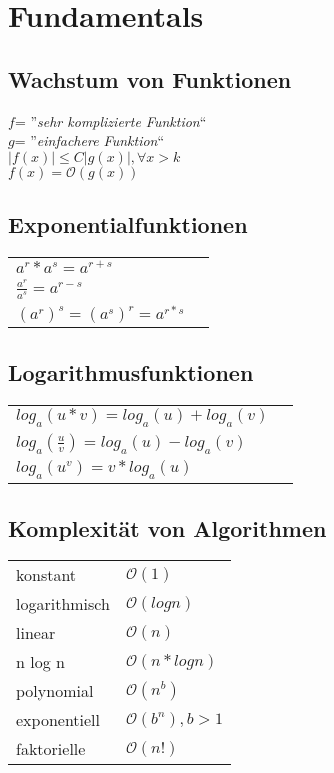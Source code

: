 \section{Fundamentals}

\subsection{Wachstum von Funktionen}
$ f $= ''\textit{sehr komplizierte Funktion}`` \\
$ g $= ''\textit{einfachere Funktion}`` \\
$ |f(x)| \leq C|g(x)|, \forall x > k $ \\
$ f(x) = \mathcal{O}(g(x)) $

\subsection{Exponentialfunktionen}
\begin{tabular}{ll}
    $ a^r * a^s = a^{r+s} $ \\
    $ \frac{a^r}{a^s} = a^{r-s} $ \\
    $ (a^r)^s = (a^s)^r = a^{r*s} $ \\
\end{tabular}

\subsection{Logarithmusfunktionen}
\begin{tabular}{ll}
    $ log_a(u * v) = log_a(u) + log_a(v) $ \\
    $ log_a(\frac{u}{v}) = log_a(u) - log_a(v) $ \\
    $ log_a(u^v) = v * log_a(u) $ \\
\end{tabular}

\subsection{Komplexität von Algorithmen}
\begin{tabular}{ll}
    konstant & $ \mathcal{O}(1) $ \\
    logarithmisch & $ \mathcal{O}(log n) $ \\ 
    linear & $ \mathcal{O}(n) $ \\
    n log n & $ \mathcal{O}(n * log n) $ \\
    polynomial & $ \mathcal{O}(n^b) $ \\
    exponentiell & $ \mathcal{O}(b^n), b > 1$ \\
    faktorielle & $ \mathcal{O}(n!) $ \\
\end{tabular}

